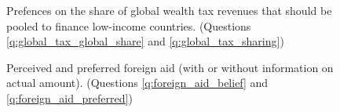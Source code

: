 \documentclass[12pt,english]{article}
\begin{document}
\begin{figure}[h!]
    \caption[Preferred share of global tax for low-income countries (summary)]{Prefences on the share of global wealth tax revenues that should be pooled to finance low-income countries. (Questions \ref{q:global_tax_global_share} and \ref{q:global_tax_sharing})}\label{fig:global_tax_share}\label{fig:global_tax_sharing}
\end{figure}

\begin{figure}[h!]
    \caption[Perceived and preferred foreign aid]{Perceived and preferred foreign aid (with or without information on actual amount). (Questions \ref{q:foreign_aid_belief} and \ref{q:foreign_aid_preferred})}\label{fig:foreign_aid_belief}\label{fig:foreign_aid_preferred_no_info}\label{fig:foreign_aid_preferred_info}\label{fig:foreign_aid_amount}
\end{figure}
\end{document}
